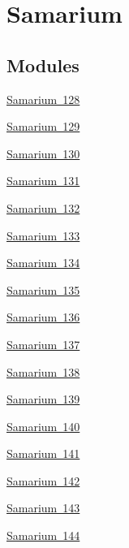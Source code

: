 \hypertarget{group___isotope_const-_samarium}{}\section{Samarium}
\label{group___isotope_const-_samarium}
\subsection*{Modules}
\begin{DoxyCompactItemize}
\item 
\mbox{\hyperlink{group___isotope_const-_samarium-_sm128}{Samarium 128}}
\item 
\mbox{\hyperlink{group___isotope_const-_samarium-_sm129}{Samarium 129}}
\item 
\mbox{\hyperlink{group___isotope_const-_samarium-_sm130}{Samarium 130}}
\item 
\mbox{\hyperlink{group___isotope_const-_samarium-_sm131}{Samarium 131}}
\item 
\mbox{\hyperlink{group___isotope_const-_samarium-_sm132}{Samarium 132}}
\item 
\mbox{\hyperlink{group___isotope_const-_samarium-_sm133}{Samarium 133}}
\item 
\mbox{\hyperlink{group___isotope_const-_samarium-_sm134}{Samarium 134}}
\item 
\mbox{\hyperlink{group___isotope_const-_samarium-_sm135}{Samarium 135}}
\item 
\mbox{\hyperlink{group___isotope_const-_samarium-_sm136}{Samarium 136}}
\item 
\mbox{\hyperlink{group___isotope_const-_samarium-_sm137}{Samarium 137}}
\item 
\mbox{\hyperlink{group___isotope_const-_samarium-_sm138}{Samarium 138}}
\item 
\mbox{\hyperlink{group___isotope_const-_samarium-_sm139}{Samarium 139}}
\item 
\mbox{\hyperlink{group___isotope_const-_samarium-_sm140}{Samarium 140}}
\item 
\mbox{\hyperlink{group___isotope_const-_samarium-_sm141}{Samarium 141}}
\item 
\mbox{\hyperlink{group___isotope_const-_samarium-_sm142}{Samarium 142}}
\item 
\mbox{\hyperlink{group___isotope_const-_samarium-_sm143}{Samarium 143}}
\item 
\mbox{\hyperlink{group___isotope_const-_samarium-_sm144}{Samarium 144}}
\item 

\end{DoxyCompactItemize}

